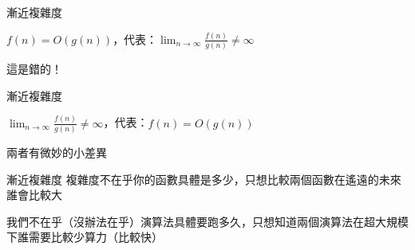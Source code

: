 \documentclass[aspectratio=169]{beamer}
\begin{document}
\begin{frame}{漸近複雜度}
  \begin{corollary}[推論（錯誤）]
    $f(n) = O(g(n))$，代表：$\lim_{n \to \infty} \frac{f(n)}{g(n)} \neq \infty$
  \end{corollary}

  這是錯的！
\end{frame}

\begin{frame}{漸近複雜度}
  \begin{corollary}[推論（正確）]
    $\lim_{n \to \infty} \frac{f(n)}{g(n)} \neq \infty$，代表：$f(n) = O(g(n))$
  \end{corollary}

  兩者有微妙的小差異
\end{frame}

\begin{frame}{漸近複雜度}
  複雜度不在乎你的函數具體是多少，只想比較兩個函數在遙遠的未來誰會比較大

  我們不在乎（沒辦法在乎）演算法具體要跑多久，只想知道兩個演算法在超大規模下誰需要比較少算力（比較快）
\end{frame}
\end{document}
